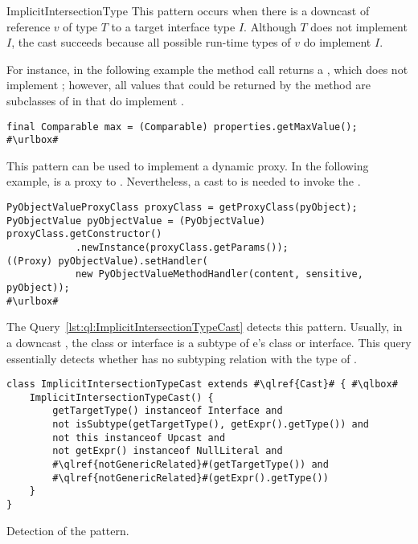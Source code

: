 \begin{pattern}{ImplicitIntersectionType}
This pattern occurs when there is a downcast of reference $v$ of type $T$ to a target interface type $I$.
Although $T$ does not implement $I$, 
the cast succeeds because all possible run-time types of $v$ do implement $I$.

\instances{}
For instance, in the following example the method call returns a ,
which does not implement ; however,
all values that could be returned by the method are subclasses of 
in  that do implement .

\def\urlvar{http://bit.ly/senbox_org_snap_desktop_2FQOt4v}
\begin{verbatim}
final Comparable max = (Comparable) properties.getMaxValue();
#\urlbox#
\end{verbatim}

This pattern can be used to implement a dynamic proxy.
In the following example,
 is a proxy to .
Nevertheless, a cast to  is needed to invoke the .

\def\urlvar{http://bit.ly/CloudSlang_cloud_slang_2EkgP4l}
\begin{verbatim}
PyObjectValueProxyClass proxyClass = getProxyClass(pyObject);
PyObjectValue pyObjectValue = (PyObjectValue) proxyClass.getConstructor()
            .newInstance(proxyClass.getParams());
((Proxy) pyObjectValue).setHandler(
            new PyObjectValueMethodHandler(content, sensitive, pyObject));
#\urlbox#
\end{verbatim}


\detection{}
The Query~\ref{lst:ql:ImplicitIntersectionTypeCast} detects this pattern.
Usually, in a downcast , the class or interface  is a subtype of {e}'s class or interface.
This query essentially detects whether  has no subtyping relation with the type of .

\begin{listing}
\begin{verbatim}
class ImplicitIntersectionTypeCast extends #\qlref{Cast}# { #\qlbox#
	ImplicitIntersectionTypeCast() {
		getTargetType() instanceof Interface and
		not isSubtype(getTargetType(), getExpr().getType()) and
		not this instanceof Upcast and
		not getExpr() instanceof NullLiteral and
		#\qlref{notGenericRelated}#(getTargetType()) and
		#\qlref{notGenericRelated}#(getExpr().getType())
	}
}
\end{verbatim}
\caption{Detection of the \thisp{} pattern.}
\label{lst:ql:ImplicitIntersectionTypeCast}
\end{listing}



\end{pattern}
